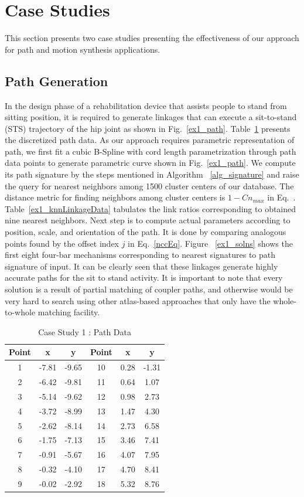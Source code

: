 \section{Case Studies}\label{sec_example}
This section presents two case studies presenting the effectiveness of our approach for path and motion synthesis applications.
\subsection{Path Generation}
In the design phase of a rehabilitation device that assists people to stand from sitting position, it is required to generate linkages that can execute a sit-to-stand (STS) trajectory of the hip joint as shown in Fig.~\ref{ex1_path}.
Table~\ref{hipPathTab} presents the discretized path data.
As our approach requires parametric representation of path, we first fit a cubic B-Spline with cord length parametrization through path data points to generate parametric curve shown in Fig.~\ref{ex1_path}.
We compute its path signature by the steps mentioned in Algorithm ~\ref{alg_signature} and raise the query for nearest neighbors among 1500 cluster centers of our database.
The distance metric for finding neighbors among cluster centers is $1-Cn_{max}$ in Eq.~.
Table~\ref{ex1_knnLinkageData} tabulates the link ratios corresponding to obtained nine nearest neighbors.
Next step is to compute actual parameters according to position, scale, and orientation of the path.
It is done by comparing analogous points found by the offset index $j$ in Eq.~\ref{nccEq}.
Figure ~\ref{ex1_solns} shows the first eight four-bar mechanisms corresponding to nearest signatures to path signature of input.
It can be clearly seen that these linkages generate highly accurate paths for the sit to stand activity.
It is important to note that every solution is a result of partial matching of coupler paths, and otherwise would be very hard to search using other atlas-based approaches that only have the whole-to-whole matching facility.

\begin{table}
\caption{Case Study 1 : Path Data}
\centering
\label{hipPathTab}
\begin{tabular}{cccccc}
\hline
Point & x & y & Point & x & y \\
\hline
1 & -7.81 & -9.65 & 10 & 0.28 & -1.31 \\
2 & -6.42 & -9.81 & 11 & 0.64 & 1.07 \\
3 & -5.14 & -9.62 & 12 & 0.98 & 2.73 \\
4 & -3.72 & -8.99 & 13 & 1.47 & 4.30 \\
5 & -2.62 & -8.14 & 14 & 2.73 & 6.58 \\
6 & -1.75 & -7.13 & 15 & 3.46 & 7.41 \\
7 & -0.91 & -5.67 & 16 & 4.07 & 7.95 \\
8 & -0.32 & -4.10 & 17 & 4.70 & 8.41 \\
9 & -0.02 & -2.92 & 18 & 5.32 & 8.76 \\
\end{tabular}
\end{table}


